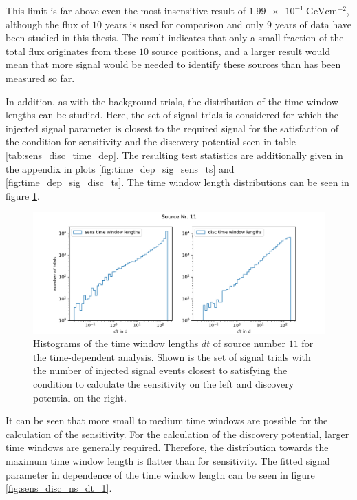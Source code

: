 This limit is far above even the most insensitive result of $\SI{1.99e-1}{\giga\electronvolt\centi\meter\tothe{-2}}$, although the flux of $\num{10}$ years is used for comparison and only $\num{9}$ years of data have been studied in this thesis.
The result indicates that only a small fraction of the total flux originates from these $10$ source positions, and a larger result would mean that more signal would be needed to identify these sources than has been measured so far.

In addition, as with the background trials, the distribution of the time window lengths can be studied.
Here, the set of signal trials is considered for which the injected signal parameter is closest to the required signal for the satisfaction of the condition for sensitivity and the discovery potential seen in table \ref{tab:sens_disc_time_dep}.
The resulting test statistics are additionally given in the appendix in plots \ref{fig:time_dep_sig_sens_ts} and \ref{fig:time_dep_sig_disc_ts}.
The time window length distributions can be seen in figure \ref{fig:sens_disc_dt_1}.
\begin{figure}
    \centering
    \includegraphics[width=\linewidth]{Plots/05_csky/9_years_gfu_gold_disc_sens_time_dep_dt_1.pdf}
    \caption{Histograms of the time window lengths $dt$ of source number $\num{11}$ for the time-dependent analysis. Shown is the set of signal trials with the number of injected signal events closest to satisfying the condition to calculate the sensitivity on the left and discovery potential on the right.}
    \label{fig:sens_disc_dt_1}
\end{figure}
It can be seen that more small to medium time windows are possible for the calculation of the sensitivity.
For the calculation of the discovery potential, larger time windows are generally required.
Therefore, the distribution towards the maximum time window length is flatter than for sensitivity.
The fitted signal parameter in dependence of the time window length can be seen in figure \ref{fig:sens_disc_ns_dt_1}.
